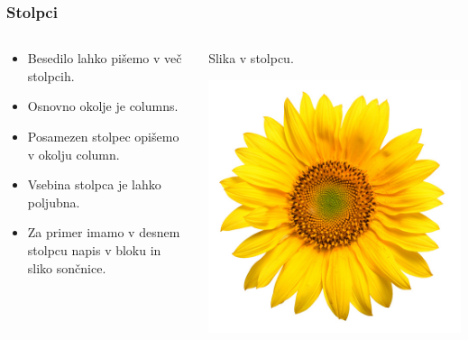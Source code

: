 \documentclass{beamer}
\begin{document}
\begin{frame}
   \frametitle{Stolpci}
      \begin{columns}
         \begin{column}{0.5\textwidth}
            \begin{itemize}
               \item Besedilo lahko pišemo v več stolpcih.
               \item Osnovno okolje je columns.
               \item Posamezen stolpec opišemo v okolju column.
               \item Vsebina stolpca je lahko poljubna.
               \item Za primer imamo v desnem stolpcu napis v bloku in sliko sončnice.
            \end{itemize}
         \end{column}
         \begin{column}{0.5\textwidth}
            \begin{exampleblock}{}
               Slika v stolpcu.
            \end{exampleblock}
            \includegraphics{soncnica.jpg}
         \end{column}
      \end{columns}
\end{frame}
\end{document}
